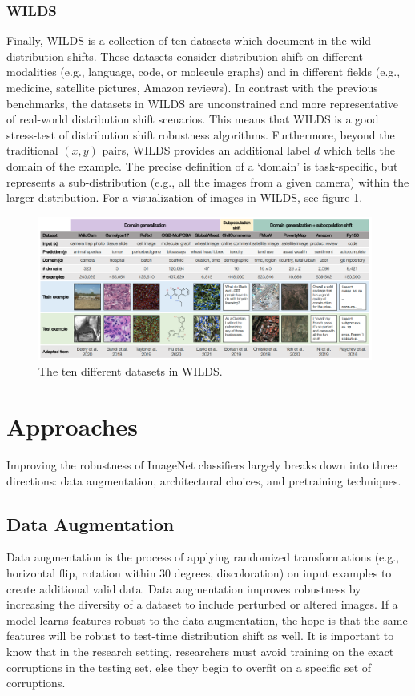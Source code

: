 \documentclass{article}
\begin{document}
\subsubsection{WILDS}
Finally, \href{https://wilds.stanford.edu/}{WILDS} \cite{koh2021wilds, sagawa2021extending} is a collection of ten datasets which document in-the-wild distribution shifts. These datasets consider distribution shift on different modalities (e.g., language, code, or molecule graphs) and in different fields (e.g., medicine, satellite pictures, Amazon reviews). In contrast with the previous benchmarks, the datasets in WILDS are unconstrained and more representative of real-world distribution shift scenarios. This means that WILDS is a good stress-test of distribution shift robustness algorithms. Furthermore, beyond the traditional $(x, y)$ pairs, WILDS provides an additional label $d$ which tells the domain of the example. The precise definition of a `domain' is task-specific, but represents a sub-distribution (e.g., all the images from a given camera) within the larger distribution. For a visualization of images in WILDS, see figure \ref{fig:wilds}.

\begin{figure}
    \centering
    \includegraphics[width=11cm]{images/wilds.png}
    \caption{The ten different datasets in WILDS.}
    \label{fig:wilds}
\end{figure}

\section{Approaches}
Improving the robustness of ImageNet classifiers largely breaks down into three  directions: data augmentation, architectural choices, and pretraining techniques.

\subsection{Data Augmentation}
Data augmentation is the process of applying randomized transformations (e.g., horizontal flip, rotation within 30 degrees, discoloration) on input examples to create additional valid data. Data augmentation improves robustness by increasing the diversity of a dataset to include perturbed or altered images. If a model learns features robust to the data augmentation, the hope is that the same features will be robust to test-time distribution shift as well. It is important to know that in the research setting, researchers must avoid training on the exact corruptions in the testing set, else they begin to overfit on a specific set of corruptions.
\end{document}
